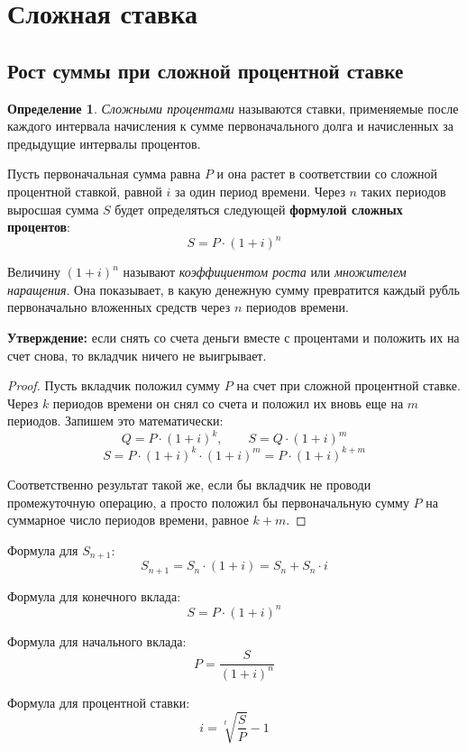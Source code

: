 \documentclass[aps,%
12pt,%
final,%
oneside,
onecolumn,%
musixtex, %
superscriptaddress,%
centertags]{article} %
\theoremstyle{plain}
\theoremstyle{definition}
\newtheorem{definition}{Определение}[subsection]
\theoremstyle{remark}
\begin{document}
\newpage
\section{Сложная ставка}

\subsection{Рост суммы при сложной процентной ставке }

\begin{definition}
\textit{Сложными процентами} называются ставки, применяемые после каждого интервала начисления к сумме первоначального долга и начисленных за предыдущие интервалы процентов.
\end{definition}

Пусть первоначальная сумма равна $P$ и она растет в соответствии со сложной процентной ставкой, равной $i$ за один период времени. Через $n$ таких периодов выросшая сумма $S$ будет определяться следующей \textbf{формулой сложных процентов}:
$$S = P \cdot (1+i)^n$$

Величину $(1+i)^n$ называют \textit{коэффициентом роста} или \textit{множителем наращения}. Она показывает, в какую денежную сумму превратится каждый рубль первоначально вложенных средств через $n$ периодов времени.

\textbf{Утверждение:} если снять со счета деньги вместе с процентами и положить их на счет снова, то вкладчик ничего не выигрывает.

\begin{proof}
	Пусть вкладчик положил сумму $P$ на счет при сложной процентной ставке. Через $k$ периодов времени он снял со счета и положил их вновь еще на $m$ периодов. Запишем это математически:
	$$Q = P \cdot (1+i)^k, \qquad S = Q\cdot (1+i)^m$$
	$$S = P \cdot (1+i)^k \cdot (1+i)^m = P \cdot (1+i)^{k+m}$$

	Соответственно результат такой же, если бы вкладчик не проводи промежуточную операцию, а просто положил бы первоначальную сумму $P$ на суммарное число периодов времени, равное $k+m$.
\end{proof}

Формула для $S_{n+1}$: $$S_{n+1}=S_n\cdot (1+i) = S_n + S_n\cdot i  $$

Формула для конечного вклада: $$S = P\cdot (1+i)^n $$

Формула для начального вклада: $$P=\frac{S}{(1+i)^n} $$

Формула для процентной ставки: $$i=\sqrt[t]{\frac{S}{P}}-1$$
\end{document}
